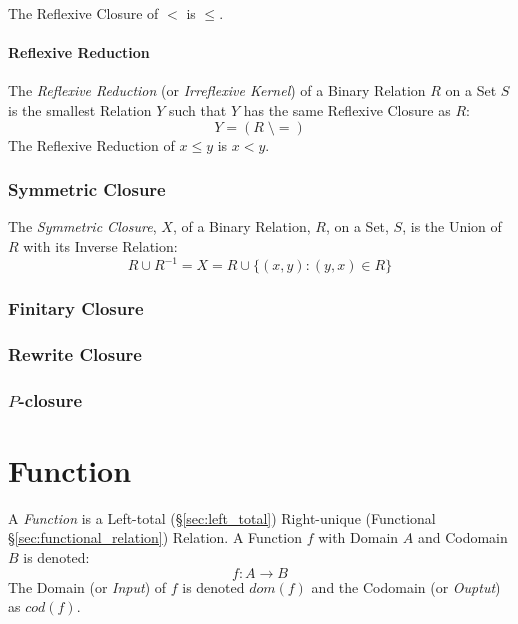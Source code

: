 The Reflexive Closure of $<$ is $\leq$.



\paragraph{Reflexive Reduction}\label{sec:reflexive_reduction}\hfill

The \emph{Reflexive Reduction} (or \emph{Irreflexive Kernel}) of a
Binary Relation $R$ on a Set $S$ is the smallest Relation $Y$ such
that $Y$ has the same Reflexive Closure as $R$:
\[
  Y = (R\;\setminus=)
\]
The Reflexive Reduction of $x \leq y$ is $x < y$.



\subsubsection{Symmetric Closure}\label{sec:symmetric_closure}

The \emph{Symmetric Closure}, $X$, of a Binary Relation, $R$, on a
Set, $S$, is the Union of $R$ with its Inverse Relation:
\[
  R \cup R^{-1} = X = R \cup \{(x,y) : (y,x) \in R\}
\]



\subsubsection{Finitary Closure}\label{sec:finitary_closure}

\subsubsection{Rewrite Closure}\label{sec:rewrite_closure}

\subsubsection{$P$-closure}\label{sec:p_closure}



\section{Function}\label{sec:set_function}

A \emph{Function} is a Left-total (\S\ref{sec:left_total})
Right-unique (Functional \S\ref{sec:functional_relation}) Relation. A
Function $f$ with Domain $A$ and Codomain $B$ is denoted:
\[
  f : A \rightarrow B
\]
The Domain (or \emph{Input}) of $f$ is denoted $dom(f)$ and the
Codomain (or \emph{Ouptut}) as $cod(f)$.

